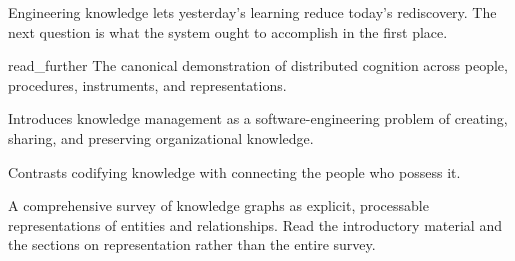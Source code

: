 Engineering knowledge lets yesterday's learning reduce today's rediscovery. The next question is
what the system ought to accomplish in the first place.

\begin{bookbox}{read_further}{} %
\citep{hutchins1995cockpit} The canonical demonstration of distributed cognition across people, procedures,
instruments, and representations.

\citep{rus2002km} Introduces knowledge management as a software-engineering problem of creating, sharing,
and preserving organizational knowledge.

\citep{hansen1999knowledge} Contrasts codifying knowledge with connecting the people who possess it.

\citep{hogan2021knowledgegraphs} A comprehensive survey of knowledge graphs as explicit, processable
representations of entities and relationships. Read the introductory material and the sections on
representation rather than the entire survey.
\end{bookbox}
